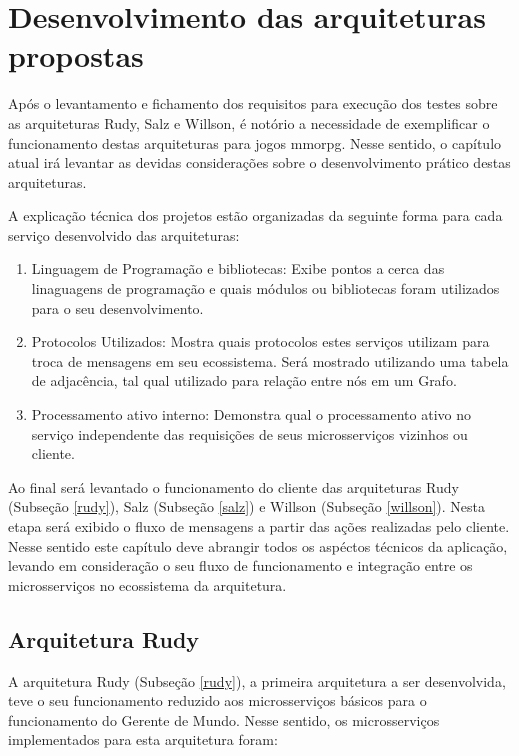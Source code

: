  
\chapter{Desenvolvimento das arquiteturas propostas}
\label{cap5}



Após o levantamento e fichamento dos requisitos para execução dos testes sobre as arquiteturas Rudy, Salz e Willson,
é notório a necessidade de exemplificar o funcionamento destas arquiteturas para jogos \ac{mmorpg}.
Nesse sentido, o capítulo atual irá levantar as devidas considerações sobre o desenvolvimento prático destas arquiteturas.



A explicação técnica dos projetos estão organizadas da seguinte forma para cada serviço desenvolvido das arquiteturas:



\begin{enumerate}
    \item Linguagem de Programação e bibliotecas: Exibe pontos a cerca das linaguagens de programação e quais módulos ou bibliotecas foram utilizados para o seu desenvolvimento.
    \item Protocolos Utilizados: Mostra quais protocolos estes serviços utilizam para troca de mensagens em seu ecossistema. Será mostrado utilizando uma tabela de adjacência, tal qual utilizado para relação entre nós em um Grafo.
    \item Processamento ativo interno: Demonstra qual o processamento ativo no serviço independente das requisições de seus microsserviços vizinhos ou cliente.
\end{enumerate}



Ao final será levantado o funcionamento do cliente das arquiteturas Rudy (Subseção \ref{rudy}), Salz (Subseção \ref{salz}) e Willson (Subseção \ref{willson}).
%
Nesta etapa será exibido o fluxo de mensagens a partir das ações realizadas pelo cliente.
%
Nesse sentido este capítulo deve abrangir todos os aspéctos técnicos da aplicação, levando em consideração o seu fluxo de funcionamento e integração entre os microsserviços no ecossistema da arquitetura.

\section{Arquitetura Rudy}
\label{sec:arc_rudy}

A arquitetura Rudy (Subseção \ref{rudy}), a primeira arquitetura a ser desenvolvida, teve o seu funcionamento reduzido aos microsserviços básicos para o funcionamento do Gerente de Mundo.
%
Nesse sentido, os microsserviços implementados para esta arquitetura foram:

